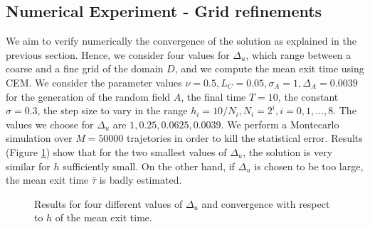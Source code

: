 \subsection{Numerical Experiment - Grid refinements}

We aim to verify numerically the convergence of the solution as explained in the previous section. Hence, we consider four values for $\Delta_u$, which range between a coarse and a fine grid of the domain $D$, and we compute the mean exit time using CEM. We consider the parameter values $\nu = 0.5, L_C = 0.05, \sigma_A = 1, \Delta_A = 0.0039$ for the generation of the random field $A$, the final time $T = 10$, the constant $\sigma = 0.3$, the step size to vary in the range $h_i = 10 / N_i, N_i = 2^i, i = 0, 1, \dots, 8$. The values we choose for $\Delta_u$ are $1, 0.25, 0.0625, 0.0039$. We perform a Montecarlo simulation over $M  = 50000$ trajetories in order to kill the statistical error. Results (Figure \ref{fig:ConvDeltau}) show that for the two smallest values of $\Delta_u$, the solution is very similar for $h$ sufficiently small. On the other hand, if $\Delta_u$ is chosen to be too large, the mean exit time $\bar \tau$ is badly estimated.

\begin{figure}[t]
    \centering
    \resizebox{0.8\linewidth}{!}{ }  
    \caption{Results for four different values of $\Delta_u$ and convergence with respect to $h$ of the mean exit time.}
    \label{fig:ConvDeltau}
\end{figure}
